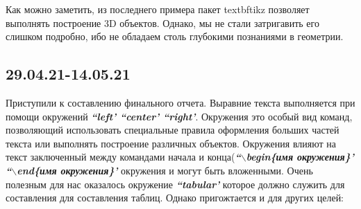 \documentclass[14pt, a4paper]{extarticle}
\begin{document}
Как можно заметить, из последнего примера пакет textbf{tikz} позволяет выполнять построение 3D объектов. Однако, мы не стали затригавить его слишком подробно, ибо не обладаем столь глубокими познаниями в геометрии. 

\subsection{29.04.21-14.05.21}
Приступили к составлению финального отчета. Выравние текста выполняется при помощи окружений 
\textit{\textbf{``left' ``center' ``right'}}. Окружения это особый вид команд, позволяющий использовать специальные правила оформления больших частей текста или выполнять построение различных объектов. Окружения влияют на текст заключенный между командами начала и конца(\textit{\textbf{``$\backslash$begin\{имя окружения\}' ``$\backslash$end\{имя окружения\}' }} окружения и могут быть вложенными. Очень полезным для нас оказалось окружение \textit{\textbf{``tabular'}} которое должно служить для составления для составления таблиц. Однако пригожтается и для других целей:








 
\end{document}
